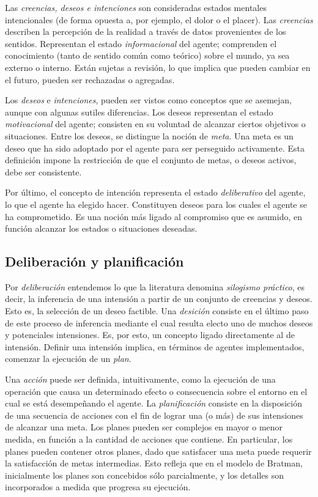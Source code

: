 Las \textit{creencias, deseos e intenciones} son consideradas estados mentales 
intencionales (de forma opuesta a, por ejemplo, el dolor o el placer). Las \textit{creencias} 
describen la percepción de la realidad a través de datos provenientes de 
los sentidos. Representan el estado \textit{informacional} del agente; comprenden
el conocimiento (tanto de sentido común como teórico) sobre el mundo, ya sea 
externo o interno. Están sujetas a revisión, lo que implica que pueden 
cambiar en el futuro, pueden ser rechazadas o agregadas. 

Los \textit{deseos} e \textit{intenciones}, pueden ser vistos como conceptos que 
se asemejan, aunque con algunas sutiles diferencias. Los deseos representan el 
estado \textit{motivacional} del agente; consisten en su voluntad de alcanzar 
ciertos objetivos o situaciones. Entre los deseos, se distingue la noción de 
\textit{meta}. Una meta es un deseo que ha sido adoptado por el agente para 
ser perseguido activamente. Esta definición impone la restricción de que el 
conjunto de metas, o deseos activos, debe ser consistente. 

Por último, el concepto de intención representa el estado \textit{deliberativo}
del agente, lo que el agente ha elegido hacer. Constituyen deseos para los cuales
el agente se ha comprometido. Es una noción más ligado al compromiso que es 
asumido, en función alcanzar los estados o situaciones deseadas. 

\subsection{Deliberación y planificación}

Por \textit{deliberación} entendemos lo que la literatura denomina \textit{silogismo práctico},
es decir, la inferencia de una intensión a partir de un conjunto de creencias y
deseos. Esto es, la selección de un deseo factible. Una \textit{desición} 
consiste en el último paso de este proceso de inferencia mediante el cual 
resulta electo uno de muchos deseos y potenciales intensiones. Es, por esto, un
concepto ligado directamente al de intensión. Definir una intensión implica, en 
términos de agentes implementados, comenzar la ejecución de un \textit{plan}.

Una \textit{acción} puede ser definida, intuitivamente, como la ejecución de
una operación que causa un determinado efecto o consecuencia sobre el entorno
en el cual se está desempeñando el agente. La \textit{planificación} consiste 
en la disposición de una secuencia de acciones con el fin de lograr una (o más)
de sus intensiones de alcanzar una meta. Los planes pueden ser complejos en 
mayor o menor medida, en función a la cantidad de acciones que contiene. En 
particular, los planes pueden contener otros planes, dado que satisfacer una
meta puede requerir la satisfacción de metas intermedias. Esto refleja que en 
el modelo de Bratman, inicialmente los planes son concebidos sólo parcialmente, 
y los detalles son incorporados a medida que progresa su ejecución.



